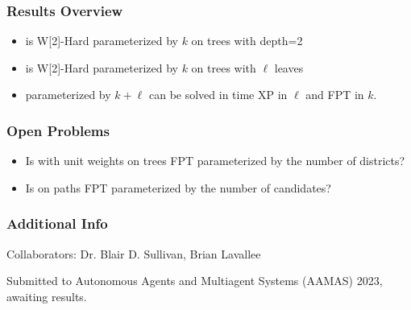 \begin{frame}[t]
    \frametitle{Results Overview}
    \begin{itemize}
        \item \gm is W[2]-Hard parameterized by $k$ on trees with depth=2
        \item \gm is W[2]-Hard parameterized by $k$ on trees with $\ell$ leaves
        \item \gm parameterized by $k+\ell$ can be solved in time XP in $\ell$ and FPT in $k$.
    \end{itemize}
    \vspace{1.0cm}
\end{frame}

\begin{frame}[t]
    \frametitle{Open Problems}
    \begin{itemize}
        \item Is \gm with unit weights on trees FPT parameterized by the number of districts?
        \item Is \gm on paths FPT parameterized by the number of candidates?
    \end{itemize}
\end{frame}

\begin{frame}[t]
    \frametitle{Additional Info}
    Collaborators: Dr. Blair D. Sullivan, Brian Lavallee

    \vspace{1.0cm}
    Submitted to Autonomous Agents and Multiagent Systems (AAMAS) 2023, awaiting results.
\end{frame}

